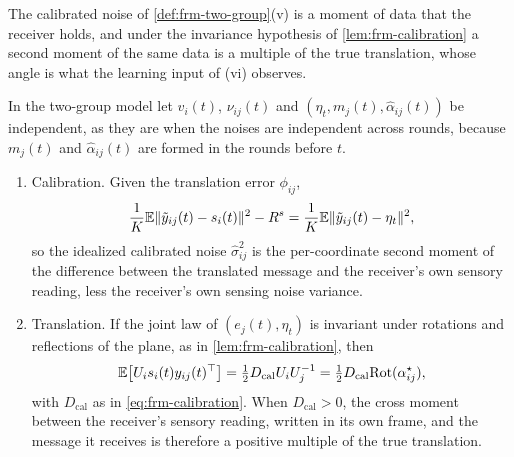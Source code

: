 The calibrated noise of \cref{def:frm-two-group}(v) is a moment of data that the receiver holds, and under the invariance hypothesis of \cref{lem:frm-calibration} a second moment of the same data is a multiple of the true translation, whose angle is what the learning input of (vi) observes.

\begin{proposition}\label{prop:frm-own-data}
In the two-group model let $v_i(t)$, $\nu_{ij}(t)$ and $(\eta_t,m_j(t),\hat\alpha_{ij}(t))$ be independent, as they are when the noises are independent across rounds, because $m_j(t)$ and $\hat\alpha_{ij}(t)$ are formed in the rounds before $t$.
\begin{enumerate}
\item[(a)] Calibration. Given the translation error $\phi_{ij}$,
\begin{equation*}
\frac1K\mathbb{E}\Vert\tilde y_{ij}(t)-s_i(t)\Vert^2-R^s=\frac1K\mathbb{E}\Vert\tilde y_{ij}(t)-\eta_t\Vert^2,
\end{equation*}
so the idealized calibrated noise $\hat\sigma^2_{ij}$ is the per-coordinate second moment of the difference between the translated message and the receiver's own sensory reading, less the receiver's own sensing noise variance.
\item[(b)] Translation. If the joint law of $(e_j(t),\eta_t)$ is invariant under rotations and reflections of the plane, as in \cref{lem:frm-calibration}, then
\begin{equation*}
\mathbb{E}\bigl[U_is_i(t)y_{ij}(t)^\top\bigr]=\tfrac12D_{\mathrm{cal}}U_iU_j^{-1}=\tfrac12D_{\mathrm{cal}}\mathrm{Rot}(\alpha^\star_{ij}),
\end{equation*}
with $D_{\mathrm{cal}}$ as in \eqref{eq:frm-calibration}. When $D_{\mathrm{cal}}>0$, the cross moment between the receiver's sensory reading, written in its own frame, and the message it receives is therefore a positive multiple of the true translation.
\end{enumerate}
\end{proposition}
